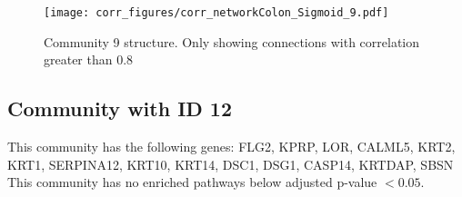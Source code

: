 \begin{figure}[h!]
\centering
\texttt{[image: corr\_figures/corr\_networkColon\_Sigmoid\_9.pdf]}
\caption{Community 9 structure. Only showing connections with correlation greater than 0.8}
\end{figure}




\subsection*{Community with ID 12}
This community has the following genes: FLG2, KPRP, LOR, CALML5, KRT2, KRT1, SERPINA12, KRT10, KRT14, DSC1, DSG1, CASP14, KRTDAP, SBSN
\\
This community has no enriched pathways below adjusted p-value $< 0.05$.

